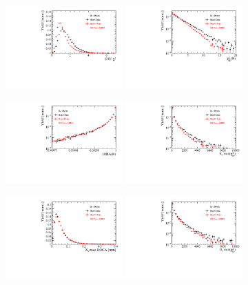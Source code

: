 \begin{figure}[h]
\centering
\includegraphics[height=!,width=0.4\textwidth]{figs/dataVsMC/run1vs2_norm/Ds2all_DTF_CHI2NDOF.pdf}
\includegraphics[height=!,width=0.4\textwidth]{figs/dataVsMC/run1vs2_norm/Ds2all_Bs_IPCHI2_OWNPV.pdf}

\includegraphics[height=!,width=0.4\textwidth]{figs/dataVsMC/run1vs2_norm/Ds2all_Bs_DIRA_OWNPV.pdf}
\includegraphics[height=!,width=0.4\textwidth]{figs/dataVsMC/run1vs2_norm/Ds2all_XsDaughters_min_IPCHI2.pdf}

\includegraphics[height=!,width=0.4\textwidth]{figs/dataVsMC/run1vs2_norm/Ds2all_Xs_max_DOCA.pdf}
\includegraphics[height=!,width=0.4\textwidth]{figs/dataVsMC/run1vs2_norm/Ds2all_DsDaughters_min_IPCHI2.pdf}


\end{figure}
